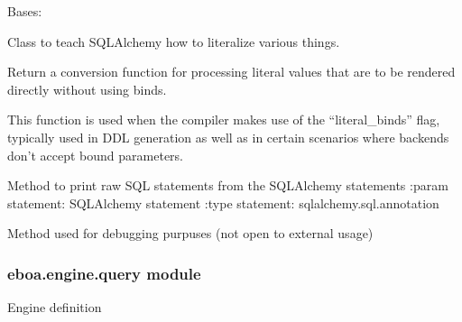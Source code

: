 \begin{fulllineitems}
\label{\detokenize{eboa.engine:eboa.engine.printing.StringLiteral}}
Bases: 

Class to teach SQLAlchemy how to literalize various things.

\begin{fulllineitems}
\label{\detokenize{eboa.engine:eboa.engine.printing.StringLiteral.literal_processor}}
Return a conversion function for processing literal values that are
to be rendered directly without using binds.

This function is used when the compiler makes use of the
“literal\_binds” flag, typically used in DDL generation as well
as in certain scenarios where backends don’t accept bound parameters.


\end{fulllineitems}


\end{fulllineitems}


\begin{fulllineitems}
\label{\detokenize{eboa.engine:eboa.engine.printing.literal_query}}
Method to print raw SQL statements from the SQLAlchemy statements
:param statement: SQLAlchemy statement
:type statement: sqlalchemy.sql.annotation

Method used for debugging purpuses (not open to external usage)

\end{fulllineitems}



\subsubsection{eboa.engine.query module}
\label{\detokenize{eboa.engine:module-eboa.engine.query}}\label{\detokenize{eboa.engine:eboa-engine-query-module}}
Engine definition

